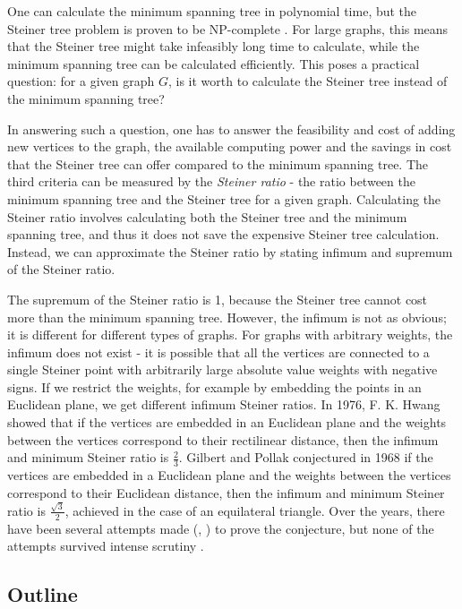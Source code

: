 \documentclass{mpaper}
\begin{document}
One can calculate the minimum spanning tree in polynomial time, but the Steiner tree problem is proven to be NP-complete \cite{Pettie2008}. For large graphs, this means that the Steiner tree might take infeasibly long time to calculate, while the minimum spanning tree can be calculated efficiently. This poses a practical question: for a given graph $G$, is it worth to calculate the Steiner tree instead of the minimum spanning tree?

 In answering such a question, one has to answer the feasibility and cost of adding new vertices to the graph, the available computing power and the savings in cost that the Steiner tree can offer compared to the minimum spanning tree. The third criteria can be measured by the \emph{Steiner ratio} - the ratio between the minimum spanning tree and the Steiner tree for a given graph. Calculating the Steiner ratio involves calculating both the Steiner tree and the minimum spanning tree, and thus it does not save the expensive Steiner tree calculation. Instead, we can approximate the Steiner ratio by stating infimum and supremum of the Steiner ratio.
 
The supremum of the Steiner ratio is 1, because the Steiner tree cannot cost more than the minimum spanning tree. However, the infimum is not as obvious; it is different for different types of graphs. For graphs with arbitrary weights, the infimum does not exist - it is possible that all the vertices are connected to a single Steiner point with arbitrarily large absolute value weights with negative signs. If we restrict the weights, for example by embedding the points in an Euclidean plane, we get different infimum Steiner ratios. In 1976, F. K. Hwang \cite{doi:10.1137/0130013} showed that if the vertices are embedded in an Euclidean plane and the weights between the vertices correspond to their rectilinear distance, then the infimum and minimum Steiner ratio is $\frac{2}{3}$. Gilbert and Pollak conjectured in 1968 \cite{GP1968} if the vertices are embedded in a Euclidean plane and the weights between the vertices correspond to their Euclidean distance, then the infimum and minimum Steiner ratio is $\frac{\sqrt{3}}{2}$, achieved in the case of an equilateral triangle. Over the years, there have been several attempts made (\cite{doi:10.1073/pnas.87.23.9464}, \cite{myue}) to prove the conjecture, but none of the attempts survived intense scrutiny \cite{Ivanov2012}. 

\subsection{Outline}
\end{document}
